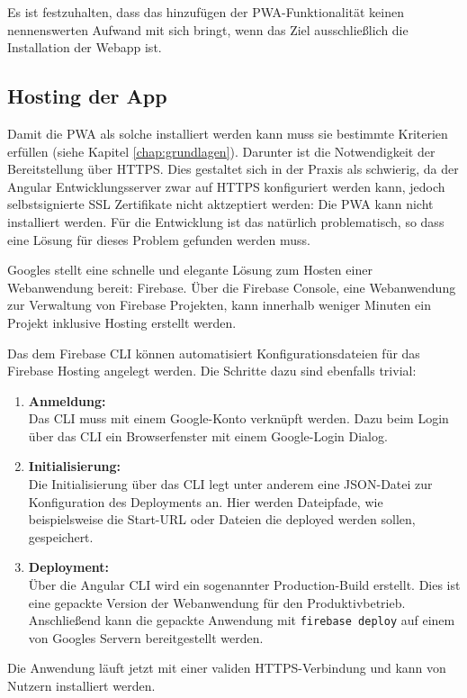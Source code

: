 Es ist festzuhalten, dass das hinzufügen der PWA-Funktionalität keinen nennenswerten Aufwand mit sich bringt, wenn das Ziel ausschließlich die Installation der Webapp ist.

\subsection{Hosting der App}
Damit die PWA als solche installiert werden kann muss sie bestimmte Kriterien erfüllen (siehe Kapitel \ref{chap:grundlagen}). Darunter ist die Notwendigkeit der Bereitstellung über HTTPS. Dies gestaltet sich in der Praxis als schwierig, da der Angular Entwicklungsserver zwar auf HTTPS konfiguriert werden kann, jedoch selbstsignierte SSL Zertifikate nicht aktzeptiert werden: Die PWA kann nicht installiert werden. Für die Entwicklung ist das natürlich problematisch, so dass eine Lösung für dieses Problem gefunden werden muss.

Googles stellt eine schnelle und elegante Lösung zum Hosten einer Webanwendung bereit: Firebase. Über die Firebase Console, eine Webanwendung zur Verwaltung von Firebase Projekten, kann innerhalb weniger Minuten ein Projekt inklusive Hosting erstellt werden.

Das dem Firebase CLI können automatisiert Konfigurationsdateien für das Firebase Hosting angelegt werden. Die Schritte dazu sind ebenfalls trivial:
\begin{enumerate}
	\item \textbf{Anmeldung: \\}
	      Das CLI muss mit einem Google-Konto verknüpft werden. Dazu beim Login über das CLI ein Browserfenster mit einem Google-Login Dialog.
	\item \textbf{Initialisierung: \\}
	      Die Initialisierung über das CLI legt unter anderem eine JSON-Datei zur Konfiguration des Deployments an. Hier werden Dateipfade, wie beispielsweise die Start-URL oder Dateien die deployed werden sollen, gespeichert.
	\item \textbf{Deployment: \\}
	      Über die Angular CLI wird ein sogenannter Production-Build erstellt. Dies ist eine gepackte Version der Webanwendung für den Produktivbetrieb.
	      Anschließend kann die gepackte Anwendung mit \texttt{firebase deploy} auf einem von Googles Servern bereitgestellt werden.
\end{enumerate}

Die Anwendung läuft jetzt mit einer validen HTTPS-Verbindung und kann von Nutzern installiert werden.

